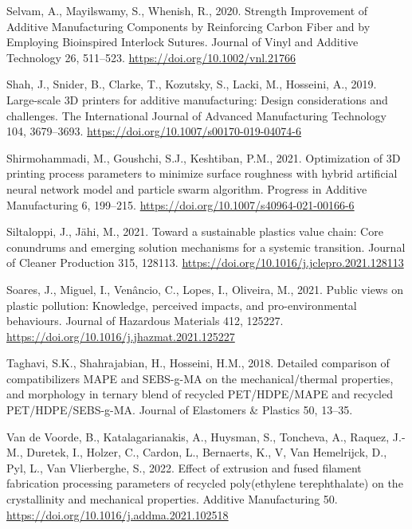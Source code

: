 \documentclass[
  12pt,
  number,
  review]{elsarticle}
\newlength{\cslhangindent}
\newlength{\cslentryspacingunit} %
\newenvironment{CSLReferences}[2] %
 {%
  \setlength{\parindent}{0pt}
  \ifodd #1
  \let\oldpar\par
  \def\par{\hangindent=\cslhangindent\oldpar}
  \fi
  \setlength{\parskip}{#2\cslentryspacingunit}
 }%
 {}
\begin{document}
\begin{CSLReferences}{1}{0}
\leavevmode{}%
Selvam, A., Mayilswamy, S., Whenish, R., 2020. Strength {Improvement} of
{Additive Manufacturing Components} by {Reinforcing Carbon Fiber} and by
{Employing Bioinspired Interlock Sutures}. Journal of Vinyl and Additive
Technology 26, 511--523. \url{https://doi.org/10.1002/vnl.21766}

\leavevmode{}%
Shah, J., Snider, B., Clarke, T., Kozutsky, S., Lacki, M., Hosseini, A.,
2019. Large-scale {3D} printers for additive manufacturing: Design
considerations and challenges. The International Journal of Advanced
Manufacturing Technology 104, 3679--3693.
\url{https://doi.org/10.1007/s00170-019-04074-6}

\leavevmode{}%
Shirmohammadi, M., Goushchi, S.J., Keshtiban, P.M., 2021. Optimization
of {3D} printing process parameters to minimize surface roughness with
hybrid artificial neural network model and particle swarm algorithm.
Progress in Additive Manufacturing 6, 199--215.
\url{https://doi.org/10.1007/s40964-021-00166-6}

\leavevmode{}%
Siltaloppi, J., Jähi, M., 2021. Toward a sustainable plastics value
chain: {Core} conundrums and emerging solution mechanisms for a systemic
transition. Journal of Cleaner Production 315, 128113.
\url{https://doi.org/10.1016/j.jclepro.2021.128113}

\leavevmode{}%
Soares, J., Miguel, I., Venâncio, C., Lopes, I., Oliveira, M., 2021.
Public views on plastic pollution: {Knowledge}, perceived impacts, and
pro-environmental behaviours. Journal of Hazardous Materials 412,
125227. \url{https://doi.org/10.1016/j.jhazmat.2021.125227}

\leavevmode{}%
Taghavi, S.K., Shahrajabian, H., Hosseini, H.M., 2018. Detailed
comparison of compatibilizers MAPE and SEBS-g-MA on the
mechanical/thermal properties, and morphology in ternary blend of
recycled PET/HDPE/MAPE and recycled PET/HDPE/SEBS-g-MA. Journal of
Elastomers \& Plastics 50, 13--35.

\leavevmode{}%
Van de Voorde, B., Katalagarianakis, A., Huysman, S., Toncheva, A.,
Raquez, J.-M., Duretek, I., Holzer, C., Cardon, L., Bernaerts, K., V,
Van Hemelrijck, D., Pyl, L., Van Vlierberghe, S., 2022. Effect of
extrusion and fused filament fabrication processing parameters of
recycled poly(ethylene terephthalate) on the crystallinity and
mechanical properties. Additive Manufacturing 50.
\url{https://doi.org/10.1016/j.addma.2021.102518}


\end{CSLReferences}
\end{document}
